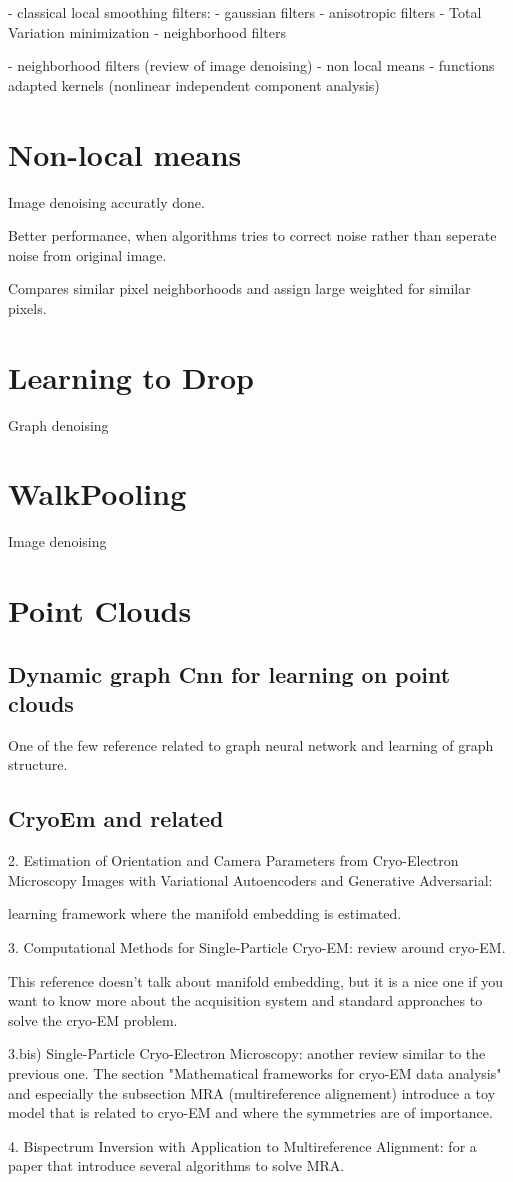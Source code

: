 - classical local smoothing filters:
    - gaussian filters
    - anisotropic filters
    - Total Variation minimization
    - neighborhood filters

- neighborhood filters (review of image denoising)
- non local means
- functions adapted kernels (nonlinear independent component analysis)


\section{Non-local means}
Image denoising accuratly done.

Better performance, when algorithms tries to correct noise rather than seperate noise
from original image.

Compares similar pixel neighborhoods and assign large weighted for similar pixels.




\section{Learning to Drop}
Graph denoising


\section{WalkPooling}
Image denoising

\section{Point Clouds}
\subsection{Dynamic graph Cnn for learning on point clouds}
One of the few reference related to graph neural network and learning of graph structure. 


\subsection{CryoEm and related}
2. Estimation of Orientation and Camera Parameters from Cryo-Electron Microscopy Images with Variational Autoencoders and Generative Adversarial: 

learning framework where the manifold embedding is estimated.

3. Computational Methods for Single-Particle Cryo-EM: 
review around cryo-EM. 

This reference doesn't talk about manifold embedding, but it is a nice one if you want to know more about 
the acquisition system and standard approaches to solve the cryo-EM problem.


3.bis) Single-Particle Cryo-Electron Microscopy: 
another review similar to the previous one. The section "Mathematical frameworks for cryo-EM data analysis" 
and especially the subsection MRA (multireference alignement) introduce 
a toy model that is related to cryo-EM and where the symmetries are of importance. 

4. Bispectrum Inversion with Application to Multireference Alignment: 
for a paper that introduce several algorithms to solve MRA.